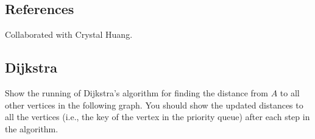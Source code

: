 \def\lc{\left\lceil}   
\def\rc{\right\rceil}
\newtheorem{claim}{Claim}
\newtheorem{property}{Property}
\runningheadrule
\firstpageheadrule
\cfoot{}
\subsection*{References}
Collaborated with Crystal Huang.
\subsection{Dijkstra}
Show the running of Dijkstra's algorithm for finding the distance from $A$ to all other vertices in the following graph. You should show the updated distances to all the vertices (i.e., the key of the vertex in the priority queue) after each step in the algorithm.


